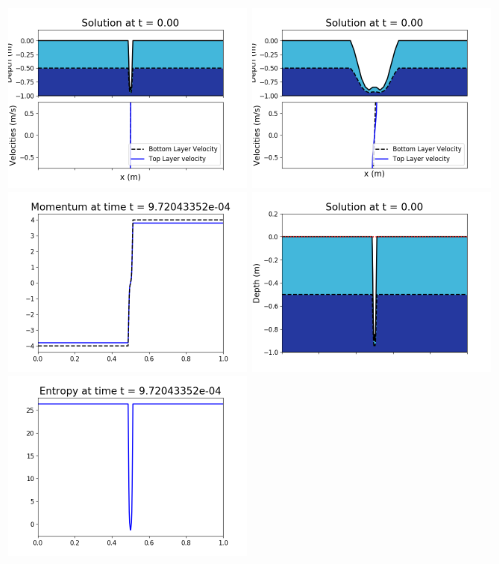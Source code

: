 \documentclass[11pt]{article}
\begin{document}
\vskip 10pt 
\includegraphics[width=0.475\textwidth]{frame0007fig1001.png}
\includegraphics[width=0.475\textwidth]{frame0007fig1002.png}
\vskip 10pt 
\includegraphics[width=0.475\textwidth]{frame0007fig1003.png}
\includegraphics[width=0.475\textwidth]{frame0007fig1006.png}
\vskip 10pt 
\includegraphics[width=0.475\textwidth]{frame0007fig1007.png}
\end{document}
